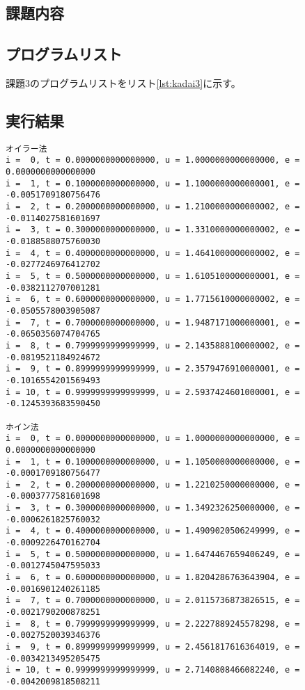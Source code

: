 \documentclass[a4j,titlepage]{jsarticle}
\begin{document}
\subsection{課題内容}

\subsection{プログラムリスト}
課題3のプログラムリストをリスト\ref{lst:kadai3}に示す。



\subsection{実行結果}
\begin{lstlisting}[style=text,caption=課題3--5の実行結果,label=lst:kekka3]
オイラー法
i =  0, t = 0.0000000000000000, u = 1.0000000000000000, e = 0.0000000000000000
i =  1, t = 0.1000000000000000, u = 1.1000000000000001, e = -0.0051709180756476
i =  2, t = 0.2000000000000000, u = 1.2100000000000002, e = -0.0114027581601697
i =  3, t = 0.3000000000000000, u = 1.3310000000000002, e = -0.0188588075760030
i =  4, t = 0.4000000000000000, u = 1.4641000000000002, e = -0.0277246976412702
i =  5, t = 0.5000000000000000, u = 1.6105100000000001, e = -0.0382112707001281
i =  6, t = 0.6000000000000000, u = 1.7715610000000002, e = -0.0505578003905087
i =  7, t = 0.7000000000000000, u = 1.9487171000000001, e = -0.0650356074704765
i =  8, t = 0.7999999999999999, u = 2.1435888100000002, e = -0.0819521184924672
i =  9, t = 0.8999999999999999, u = 2.3579476910000001, e = -0.1016554201569493
i = 10, t = 0.9999999999999999, u = 2.5937424601000001, e = -0.1245393683590450

ホイン法
i =  0, t = 0.0000000000000000, u = 1.0000000000000000, e = 0.0000000000000000
i =  1, t = 0.1000000000000000, u = 1.1050000000000000, e = -0.0001709180756477
i =  2, t = 0.2000000000000000, u = 1.2210250000000000, e = -0.0003777581601698
i =  3, t = 0.3000000000000000, u = 1.3492326250000000, e = -0.0006261825760032
i =  4, t = 0.4000000000000000, u = 1.4909020506249999, e = -0.0009226470162704
i =  5, t = 0.5000000000000000, u = 1.6474467659406249, e = -0.0012745047595033
i =  6, t = 0.6000000000000000, u = 1.8204286763643904, e = -0.0016901240261185
i =  7, t = 0.7000000000000000, u = 2.0115736873826515, e = -0.0021790200878251
i =  8, t = 0.7999999999999999, u = 2.2227889245578298, e = -0.0027520039346376
i =  9, t = 0.8999999999999999, u = 2.4561817616364019, e = -0.0034213495205475
i = 10, t = 0.9999999999999999, u = 2.7140808466082240, e = -0.0042009818508211


\end{lstlisting}
\end{document}
